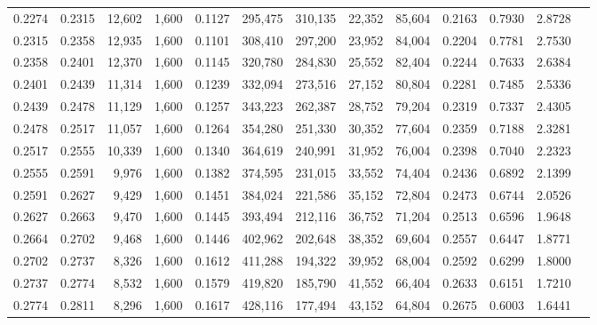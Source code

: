\begin{tabular}{rrrrrrrrrrrrr}
0.2274 & 0.2315 & 12,602 & 1,600 &                                     0.1127 & 295,475 & 310,135 &  22,352 &  85,604 & 0.2163 & 0.7930 & 2.8728 \\
0.2315 & 0.2358 & 12,935 & 1,600 &                                     0.1101 & 308,410 & 297,200 &  23,952 &  84,004 & 0.2204 & 0.7781 & 2.7530 \\
0.2358 & 0.2401 & 12,370 & 1,600 &                                     0.1145 & 320,780 & 284,830 &  25,552 &  82,404 & 0.2244 & 0.7633 & 2.6384 \\
0.2401 & 0.2439 & 11,314 & 1,600 &                                     0.1239 & 332,094 & 273,516 &  27,152 &  80,804 & 0.2281 & 0.7485 & 2.5336 \\
0.2439 & 0.2478 & 11,129 & 1,600 &                                     0.1257 & 343,223 & 262,387 &  28,752 &  79,204 & 0.2319 & 0.7337 & 2.4305 \\
0.2478 & 0.2517 & 11,057 & 1,600 &                                     0.1264 & 354,280 & 251,330 &  30,352 &  77,604 & 0.2359 & 0.7188 & 2.3281 \\
0.2517 & 0.2555 & 10,339 & 1,600 &                                     0.1340 & 364,619 & 240,991 &  31,952 &  76,004 & 0.2398 & 0.7040 & 2.2323 \\
0.2555 & 0.2591 &  9,976 & 1,600 &                                     0.1382 & 374,595 & 231,015 &  33,552 &  74,404 & 0.2436 & 0.6892 & 2.1399 \\
0.2591 & 0.2627 &  9,429 & 1,600 &                                     0.1451 & 384,024 & 221,586 &  35,152 &  72,804 & 0.2473 & 0.6744 & 2.0526 \\
0.2627 & 0.2663 &  9,470 & 1,600 &                                     0.1445 & 393,494 & 212,116 &  36,752 &  71,204 & 0.2513 & 0.6596 & 1.9648 \\
0.2664 & 0.2702 &  9,468 & 1,600 &                                     0.1446 & 402,962 & 202,648 &  38,352 &  69,604 & 0.2557 & 0.6447 & 1.8771 \\
0.2702 & 0.2737 &  8,326 & 1,600 &                                     0.1612 & 411,288 & 194,322 &  39,952 &  68,004 & 0.2592 & 0.6299 & 1.8000 \\
0.2737 & 0.2774 &  8,532 & 1,600 &                                     0.1579 & 419,820 & 185,790 &  41,552 &  66,404 & 0.2633 & 0.6151 & 1.7210 \\
0.2774 & 0.2811 &  8,296 & 1,600 &                                     0.1617 & 428,116 & 177,494 &  43,152 &  64,804 & 0.2675 & 0.6003 & 1.6441 \\

\end{tabular}
